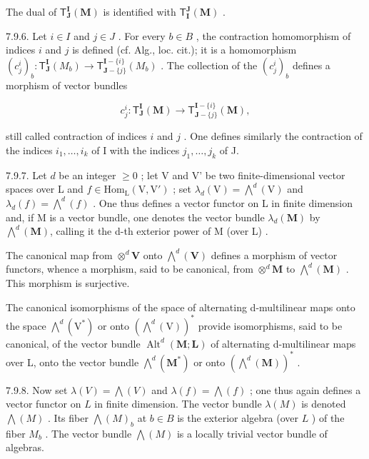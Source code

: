 The dual of \(\mathsf{T}_{\mathbf{J}}^{\mathbf{I}}(\mathbf{M})\) is identified with \(\mathsf{T}_{\mathbf{I}}^{\mathbf{J}}(\mathbf{M})\) .

7.9.6. Let \(i \in I\) and \(j \in J\) . For every \(b \in B\) , the contraction homomorphism of indices \(i\) and \(j\) is defined (cf. Alg., loc. cit.); it is a homomorphism \((c_j^i)_b: \mathsf{T}_{\mathbf{J}}^{\mathbf{I}}(M_b) \to \mathsf{T}_{\mathbf{J}-\{j\}}^{\mathbf{I}-\{i\}}(M_b)\) . The collection of the \((c_j^i)_b\) defines a morphism of vector bundles

\[
c _ {j} ^ {i}: \mathsf {T} _ {\mathbf {J}} ^ {\mathbf {I}} (\mathbf {M}) \to \mathsf {T} _ {\mathbf {J} - \{j \}} ^ {\mathbf {I} - \{i \}} (\mathbf {M}),
\]

still called contraction of indices \(i\) and \(j\) . One defines similarly the contraction of the indices \(i_{1},\ldots,i_{k}\) of I with the indices \(j_{1},\ldots,j_{k}\) of J.

7.9.7. Let \(d\) be an integer \(\geqslant 0\) ; let V and V' be two finite-dimensional vector spaces over L and \(f \in \mathrm{Hom}_{\mathrm{L}}(\mathrm{V}, \mathrm{V}')\) ; set \(\lambda_{d}(\mathrm{V}) = \bigwedge^{d}(\mathrm{V})\) and \(\lambda_{d}(f) = \bigwedge^{d}(f)\) . One thus defines a vector functor on L in finite dimension and, if M is a vector bundle, one denotes the vector bundle \(\lambda_{d}(\mathbf{M})\) by \(\bigwedge^{d}(\mathbf{M})\), calling it the d-th exterior power of M (over L) .

The canonical map from \(\otimes^{d}\mathbf{V}\) onto \(\bigwedge^{d}(\mathbf{V})\) defines a morphism of vector functors, whence a morphism, said to be canonical, from \(\otimes^{d}\mathbf{M}\) to \(\bigwedge^{d}(\mathbf{M})\) . This morphism is surjective.

The canonical isomorphisms of the space of alternating d-multilinear maps onto the space \(\bigwedge^{d}(\mathrm{V}^{*})\) or onto \((\bigwedge^{d}(\mathrm{V}))^{*}\) provide isomorphisms, said to be canonical, of the vector bundle \(\operatorname{Alt}^{d}(\mathbf{M};\mathbf{L})\) of alternating d-multilinear maps over L, onto the vector bundle \(\bigwedge^{d}(\mathbf{M}^{*})\) or onto \((\bigwedge^{d}(\mathbf{M}))^{*}\) .

7.9.8. Now set \(\lambda(V) = \bigwedge(V)\) and \(\lambda(f) = \bigwedge(f)\) ; one thus again defines a vector functor on \(L\) in finite dimension. The vector bundle \(\lambda(M)\) is denoted \(\bigwedge(M)\) . Its fiber \(\bigwedge(M)_b\) at \(b \in B\) is the exterior algebra (over \(L\) ) of the fiber \(M_b\) . The vector bundle \(\bigwedge(M)\) is a locally trivial vector bundle of algebras.

